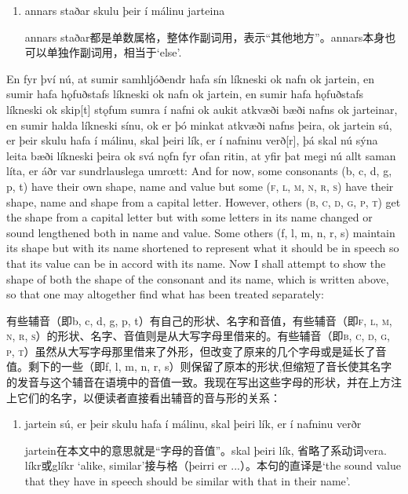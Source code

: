 \begin{grammar*}{}
    \begin{enumerate}[leftmargin=*]
        \item annars staðar skulu þeir í málinu jarteina

              annars staðar都是单数属格，整体作副词用，表示“其他地方”。annars本身也可以单独作副词用，相当于`else'.

    \end{enumerate}
\end{grammar*}
\begin{paracol}{2}
    En fyr því nú, at sumir samhljóðendr hafa sín líkneski ok nafn ok jartein, en sumir hafa hǫfuðstafs líkneski ok nafn ok jartein, en sumir hafa hǫfuðstafs líkneski ok skip[t] stǫfum sumra í nafni ok aukit atkvæði bæði nafns ok jarteinar, en sumir halda líkneski sínu, ok er þó minkat atkvæði nafns þeira, ok jartein sú, er þeir skulu hafa í málinu, skal þeiri lík, er í nafninu verð[r], þá skal nú sýna leita bæði líkneski þeira ok svá nǫfn fyr ofan ritin, at yfir þat megi nú allt saman líta, er áðr var sundrlauslega umrœtt:
    \switchcolumn
    And for now, some consonants (b, c, d, g, p, t) have their own shape, name and value but some (\textsc{f, l, m, n, r, s}) have their shape, name and shape from a capital letter. However, others (\textsc{b, c, d, g, p, t}) get the shape from a capital letter but with some letters in its name changed or sound lengthened both in name and value. Some others (f, l, m, n, r, s) maintain its shape but with its name shortened to represent what it should be in speech so that its value can be in accord with its name. Now I shall attempt to show the shape of both the shape of the consonant and its name, which is written above, so that one may altogether find what has been treated separately:
\end{paracol}
\begin{translation*}{}
    有些辅音（即b, c, d, g, p, t）有自己的形状、名字和音值，有些辅音（即\textsc{f, l, m, n, r, s}）的形状、名字、音值则是从大写字母里借来的。有些辅音（即\textsc{b, c, d, g, p, t}）虽然从大写字母那里借来了外形，但改变了原来的几个字母或是延长了音值。剩下的一些（即f, l, m, n, r, s）则保留了原本的形状,但缩短了音长使其名字的发音与这个辅音在语境中的音值一致。我现在写出这些字母的形状，并在上方注上它们的名字，以便读者直接看出辅音的音与形的关系：
\end{translation*}
\begin{grammar*}{}
    \begin{enumerate}[leftmargin=*]
        \item jartein sú, er þeir skulu hafa í málinu, skal þeiri lík, er í nafninu verðr

              jartein在本文中的意思就是“字母的音值”。skal þeiri lík, 省略了系动词vera. líkr或glíkr `alike, similar'接与格（þeirri er ...）。本句的直译是`the sound value that they have in speech should be similar with that in their name'.

    \end{enumerate}
\end{grammar*}
